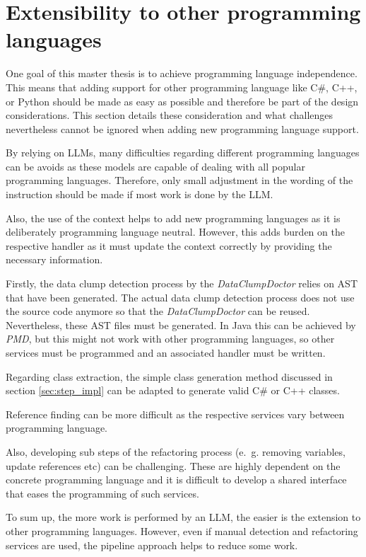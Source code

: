 \section{Extensibility to  other programming languages}

One goal of this master thesis is to achieve programming language independence. This means that adding support for other programming language like  C\#, C++, or Python should be made as easy as possible and therefore be part of the design considerations. This section details these consideration and what challenges nevertheless cannot be ignored when adding new programming language support.

By relying on \acp{LLM}, many difficulties regarding different programming languages can be avoids as these models are capable of dealing with all popular programming languages. Therefore, only small adjustment in the wording of the instruction should be made if most work is done by the \ac{LLM}.

Also, the use of the context helps to add new programming languages as it is deliberately programming language neutral. However, this adds burden on the respective handler as it must update the context correctly by providing the necessary information. 

Firstly, the data clump detection process by the \textit{DataClumpDoctor} relies on \ac{AST} that have been generated. The actual data clump detection process does not use the source code anymore so that the \textit{DataClumpDoctor} can be reused. Nevertheless, these \ac{AST} files must be generated. In Java this can be achieved by \textit{PMD}, but this might not work with other programming languages, so other services must be programmed and an associated handler must be written.

Regarding class extraction, the simple class generation method discussed in section \ref{sec:step_impl} can be adapted to generate valid C\# or C++ classes.

Reference finding can be more difficult as the respective services vary between programming language.

Also, developing sub steps  of the refactoring process (e.~g. removing variables, update references etc) can be challenging. These are highly dependent on the concrete programming language and it is difficult to develop a shared interface that eases the programming of such services.

To sum up, the more work is performed by an \ac{LLM}, the easier is the extension to other programming languages. However, even if manual detection and refactoring services are used, the pipeline approach helps to reduce some work.  

